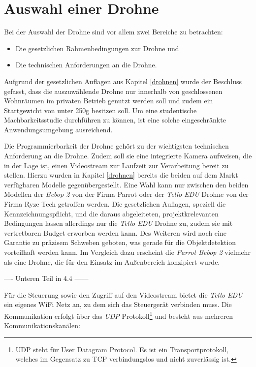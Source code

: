 \section{Auswahl einer Drohne} \label{drone_selection}

Bei der Auswahl der Drohne sind vor allem zwei Bereiche zu betrachten:

\begin{itemize}
	\item Die gesetzlichen Rahmenbedingungen zur Drohne und
	\item Die technischen Anforderungen an die Drohne.
\end{itemize}

Aufgrund der gesetzlichen Auflagen aus Kapitel \ref{drohnen} wurde der Beschluss gefasst, dass die auszuwählende Drohne nur innerhalb von geschlossenen Wohnräumen im privaten Betrieb genutzt werden soll und zudem ein Startgewicht von unter 250g besitzen soll. Um eine studentische Machbarkeitsstudie durchführen zu können, ist eine solche eingeschränkte Anwendungsumgebung ausreichend. 

Die Programmierbarkeit der Drohne gehört zu der wichtigsten technischen Anforderung an die Drohne. Zudem soll sie eine integrierte Kamera aufweisen, die in der Lage ist, einen Videostream zur Laufzeit zur Verarbeitung bereit zu stellen. Hierzu wurden in Kapitel \ref{drohnen} bereits die beiden auf dem Markt verfügbaren Modelle  gegenübergestellt. Eine Wahl kann nur zwischen den beiden Modellen der \textit{Bebop 2} von der Firma Parrot oder der \textit{Tello EDU} Drohne von der Firma Ryze Tech getroffen werden. Die gesetzlichen Auflagen, speziell die Kennzeichnungspflicht, und die daraus abgeleiteten, projektkrelevanten Bedingungen lassen allerdings nur die \textit{Tello EDU} Drohne zu, zudem sie mit vertretbaren Budget erworben werden kann. Des Weiteren wird noch eine Garantie zu präzisem Schweben geboten, was gerade für die Objektdetektion vorteilhaft werden kann. Im Vergleich dazu erscheint die \textit{Parrot Bebop 2} vielmehr als eine Drohne, die für den Einsatz im Außenbereich konzipiert wurde.

---- Unteren Teil in 4.4 ------

Für die Steuerung sowie den Zugriff auf den Videostream bietet die \textit{Tello EDU} ein eigenes WiFi Netz an, zu dem sich das Steuergerät verbinden muss. Die Kommunikation erfolgt über das \textit{UDP} Protokoll\footnote{UDP steht für User Datagram Protocol. Es ist ein Transportprotokoll, welches im Gegensatz zu TCP verbindungslos und nicht zuverlässig ist.} und besteht aus mehreren Kommunikationskanälen: 

